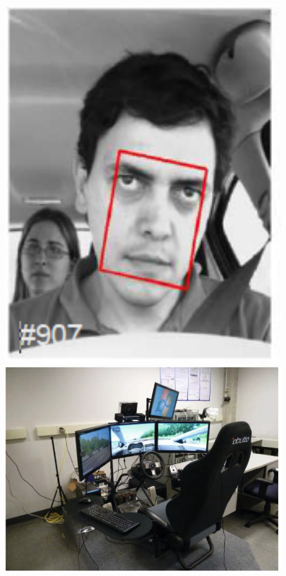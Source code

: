 \documentclass{beamer}
\begin{document}
\begin{frame}
\begin{columns}
\begin{column}{0.25\textwidth}
\begin{center}
					\includegraphics[width=0.9\textwidth]{frontal-view-dataset} \\
					\includegraphics[width=0.9\textwidth]{RanForSim}
				\end{center}
			\end{column}
		\end{columns}
	\end{frame}
\end{document}
